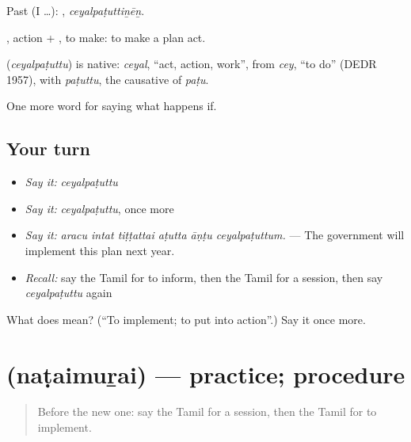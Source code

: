 Past (I …): , \emph{ceyalpaṭuttiṉēṉ}.

, action + , to make: to make a plan act.

\begin{cousinweb}
\textbf{} (\emph{ceyalpaṭuttu}) is native: \emph{ceyal}, \textquotedblleft{}act, action, work\textquotedblright{}, from \emph{cey}, \textquotedblleft{}to do\textquotedblright{} (DEDR 1957), with \emph{paṭuttu}, the causative of \emph{paṭu}.
\end{cousinweb}

\begin{grammarlens}[title={What you've built}]
One more word for saying what happens if.
\end{grammarlens}

\subsection*{Your turn}
\begin{itemize}
\raggedright
  \item \emph{Say it:} \emph{ceyalpaṭuttu}
  \item \emph{Say it:} \emph{ceyalpaṭuttu}, once more
  \item \emph{Say it:} \emph{aracu intat tiṭṭattai aṭutta āṇṭu ceyalpaṭuttum.} — The government will implement this plan next year.
  \item \emph{Recall:} say the Tamil for to inform, then the Tamil for a session, then say \emph{ceyalpaṭuttu} again
\end{itemize}

\begin{tcolorbox}[breakable,colback=teal!4,colframe=teal!35!black,title={Before you move on}]
What does  mean? (\textquotedblleft{}To implement; to put into action\textquotedblright{}.) Say it once more.
\end{tcolorbox}
\section[\texorpdfstring{\ta{நடைமுறை} (naṭaimuṟai)}{நடைமுறை (naṭaimuṟai)}]{ (naṭaimuṟai) — practice; procedure}

\label{lesson:TA-C389-nataimurai}



\begin{quote}
Before the new one: say the Tamil for a session, then the Tamil for to implement.
\end{quote}

